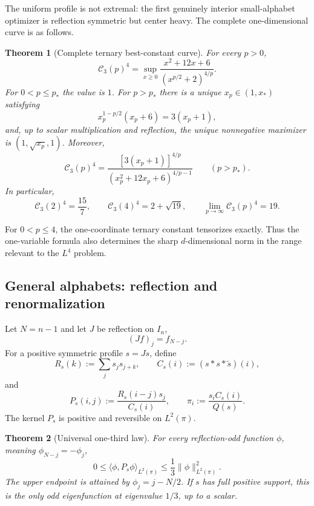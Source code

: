 \documentclass[11pt,reqno]{amsart}
\numberwithin{equation}{section}
\newtheorem{theorem}{Theorem}[section]
\theoremstyle{definition}
\theoremstyle{remark}
\newcommand{\cC}{\mathcal C}
\newcommand{\rev}{\widetilde}
\begin{document}
The uniform profile is not extremal: the first genuinely interior small-alphabet optimizer is reflection symmetric but center heavy.  The complete one-dimensional curve is as follows.

\begin{theorem}[Complete ternary best-constant curve]\label{thm:intro-allp}
For every $p>0$,
\begin{equation}\label{eq:intro-allp}
  \cC_3(p)^4
  =\sup_{x\ge0}
  \frac{x^2+12x+6}{(x^{p/2}+2)^{4/p}}.
\end{equation}
For $0<p\le p_*$ the value is $1$.  For $p>p_*$ there is a unique $x_p\in(1,x_*)$ satisfying
\begin{equation}\label{eq:intro-xp}
  x_p^{1-p/2}(x_p+6)=3(x_p+1),
\end{equation}
and, up to scalar multiplication and reflection, the unique nonnegative maximizer is $(1,\sqrt{x_p},1)$.  Moreover,
\begin{equation}\label{eq:intro-closed-value}
  \cC_3(p)^4
  =\frac{[3(x_p+1)]^{4/p}}
  {(x_p^2+12x_p+6)^{4/p-1}}
  \qquad(p>p_*).
\end{equation}
In particular,
\[
  \cC_3(2)^4=\frac{15}{7},
  \qquad
  \cC_3(4)^4=2+\sqrt{19},
  \qquad
  \lim_{p\to\infty}\cC_3(p)^4=19.
\]
\end{theorem}

For $0<p\le4$, the one-coordinate ternary constant tensorizes exactly.  Thus the one-variable formula also determines the sharp $d$-dimensional norm in the range relevant to the $L^4$ problem.

\subsection{General alphabets: reflection and renormalization}
Let $N=n-1$ and let $J$ be reflection on $I_n$,
\[
  (Jf)_j=f_{N-j}.
\]
For a positive symmetric profile $s=Js$, define
\[
  R_s(k):=\sum_j s_js_{j+k},
  \qquad
  C_s(i):=(s*s*\rev s)(i),
\]
and
\begin{equation}\label{eq:intro-P}
  P_s(i,j):=\frac{R_s(i-j)s_j}{C_s(i)},
  \qquad
  \pi_i:=\frac{s_iC_s(i)}{Q(s)}.
\end{equation}
The kernel $P_s$ is positive and reversible on $L^2(\pi)$.

\begin{theorem}[Universal one-third law]\label{thm:intro-third}
For every reflection-odd function $\phi$, meaning $\phi_{N-j}=-\phi_j$,
\begin{equation}\label{eq:intro-third}
  0\le\langle\phi,P_s\phi\rangle_{L^2(\pi)}
  \le\frac13\|\phi\|_{L^2(\pi)}^2.
\end{equation}
The upper endpoint is attained by $\phi_j=j-N/2$.  If $s$ has full positive support, this is the only odd eigenfunction at eigenvalue $1/3$, up to a scalar.
\end{theorem}
\end{document}
